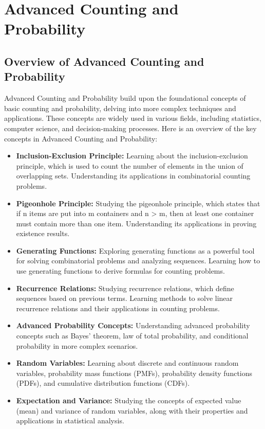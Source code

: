 \documentclass[openany]{book}
\begin{document}
\section{Advanced Counting and Probability}
\subsection{Overview of Advanced Counting and Probability}
Advanced Counting and Probability build upon the foundational concepts of basic counting and probability, delving into more complex techniques and applications. These concepts are widely used in various fields, including statistics, computer science, and decision-making processes. Here is an overview of the key concepts in Advanced Counting and Probability:
\begin{itemize}
    \item \textbf{Inclusion-Exclusion Principle:} Learning about the inclusion-exclusion principle, which is used to count the number of elements in the union of overlapping sets. Understanding its applications in combinatorial counting problems.
    \item \textbf{Pigeonhole Principle:} Studying the pigeonhole principle, which states that if n items are put into m containers and n > m, then at least one container must contain more than one item. Understanding its applications in proving existence results.
    \item \textbf{Generating Functions:} Exploring generating functions as a powerful tool for solving combinatorial problems and analyzing sequences. Learning how to use generating functions to derive formulas for counting problems.
    \item \textbf{Recurrence Relations:} Studying recurrence relations, which define sequences based on previous terms. Learning methods to solve linear recurrence relations and their applications in counting problems.
    \item \textbf{Advanced Probability Concepts:} Understanding advanced probability concepts such as Bayes' theorem, law of total probability, and conditional probability in more complex scenarios.
    \item \textbf{Random Variables:} Learning about discrete and continuous random variables, probability mass functions (PMFs), probability density functions (PDFs), and cumulative distribution functions (CDFs).
    \item \textbf{Expectation and Variance:} Studying the concepts of expected value (mean) and variance of random variables, along with their properties and applications in statistical analysis.

\end{itemize}
\end{document}
